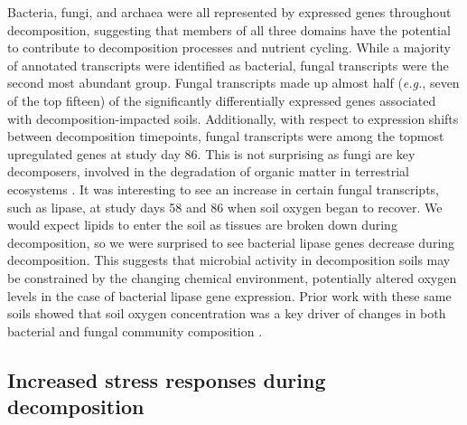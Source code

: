 \documentclass[
  sn-nature,
  lineno, referee]{sn-jnl}
\begin{document}
Bacteria, fungi, and archaea were all represented by expressed genes
throughout decomposition, suggesting that members of all three domains
have the potential to contribute to decomposition processes and nutrient
cycling. While a majority of annotated transcripts were identified as
bacterial, fungal transcripts were the second most abundant group.
Fungal transcripts made up almost half (\emph{e.g.}, seven of the top
fifteen) of the significantly differentially expressed genes associated
with decomposition-impacted soils. Additionally, with respect to
expression shifts between decomposition timepoints, fungal transcripts
were among the topmost upregulated genes at study day 86. This is not
surprising as fungi are key decomposers, involved in the degradation of
organic matter in terrestrial ecosystems
\citep{van_der_wal_thready_2013}. It was interesting to see an increase
in certain fungal transcripts, such as lipase, at study days 58 and 86
when soil oxygen began to recover. We would expect lipids to enter the
soil as tissues are broken down during decomposition, so we were
surprised to see bacterial lipase genes decrease during decomposition.
This suggests that microbial activity in decomposition soils may be
constrained by the changing chemical environment, potentially altered
oxygen levels in the case of bacterial lipase gene expression. Prior
work with these same soils showed that soil oxygen concentration was a
key driver of changes in both bacterial and fungal community composition
\citep{taylor_transient_2024}.

\subsection{Increased stress responses during
decomposition}\label{increased-stress-responses-during-decomposition}
\end{document}
